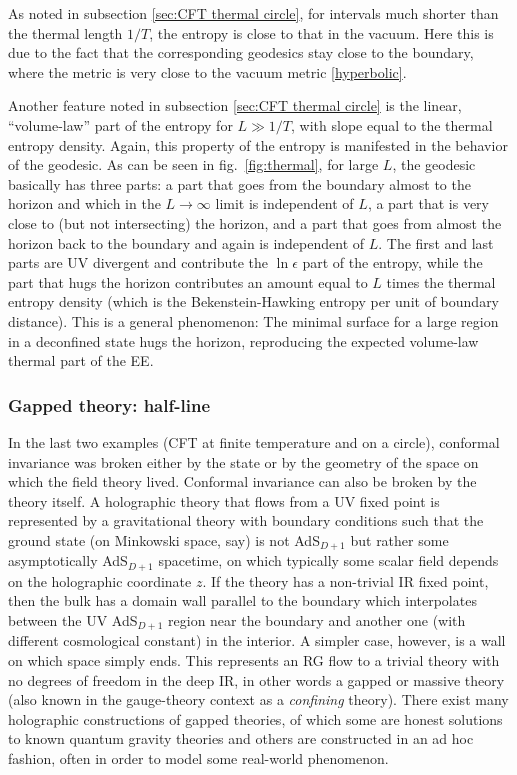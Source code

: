 \documentclass[11pt]{article}
\begin{document}
As noted in subsection \ref{sec:CFT thermal circle}, for intervals much shorter than the thermal length $1/T$, the entropy is close to that in the vacuum. Here this is due to the fact that the corresponding geodesics stay close to the boundary, where the metric is very close to the vacuum metric \eqref{hyperbolic}. 

Another feature noted in subsection \ref{sec:CFT thermal circle} is the linear, ``volume-law'' part of the entropy for $L\gg1/T$, with slope equal to the thermal entropy density. Again, this property of the entropy is manifested in the behavior of the geodesic. As can be seen in fig.\ \ref{fig:thermal}, for large $L$, the geodesic basically has three parts: a part that goes from the boundary almost to the horizon and which in the $L\to\infty$ limit is independent of $L$, a part that is very close to (but not intersecting) the horizon, and a part that goes from almost the horizon back to the boundary and again is independent of $L$. The first and last parts are UV divergent and contribute the $\ln\epsilon$ part of the entropy, while the part that hugs the horizon contributes an amount equal to $L$ times the thermal entropy density (which is the Bekenstein-Hawking entropy per unit of boundary distance). This is a general phenomenon: The minimal surface for a large region in a deconfined state hugs the horizon, reproducing the expected volume-law thermal part of the EE.



\subsubsection{Gapped theory: half-line}
\label{sec:gapped}

In the last two examples (CFT at finite temperature and on a circle), conformal invariance was broken either by the state or by the geometry of the space on which the field theory lived. Conformal invariance can also be broken by the theory itself. A holographic theory that flows from a UV fixed point is represented by a gravitational theory with boundary conditions such that the ground state (on Minkowski space, say) is not AdS$_{D+1}$ but rather some asymptotically AdS$_{D+1}$ spacetime, on which typically some scalar field depends on the holographic coordinate $z$. If the theory has a non-trivial IR fixed point, then the bulk has a domain wall parallel to the boundary which interpolates between the UV AdS$_{D+1}$ region near the boundary and another one (with different cosmological constant) in the interior. A simpler case, however, is a wall on which space simply ends. This represents an RG flow to a trivial theory with no degrees of freedom in the deep IR, in other words a gapped or massive theory (also known in the gauge-theory context as a \emph{confining} theory). There exist many holographic constructions of gapped theories, of which some are honest solutions to known quantum gravity theories and others are constructed in an ad hoc fashion, often in order to model some real-world phenomenon.
\end{document}
